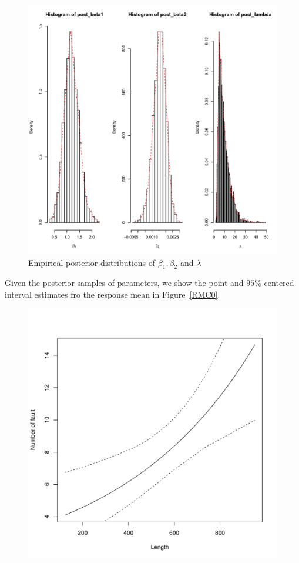 \documentclass[]{article}
\begin{document}
\begin{enumerate}
{\begin{itemize}
\begin{figure}[ht!]
				\centering
				\includegraphics[scale = 0.4]{"pic/HW5_1/pos0"}
				\caption{Empirical posterior distributions of $\beta_1, \beta_2$ and $\lambda$}
				\label{pos0}
			\end{figure}
			Given the posterior samples of parameters, we show the point and $95\%$ centered interval estimates fro the response mean in Figure~\ref{RMC0}.
			\begin{figure}[ht!]
				\centering
				\includegraphics[scale = 0.4]{"pic/HW5_1/RMC0"}

\end{figure}
\end{itemize}}
\end{enumerate}
\end{document}
